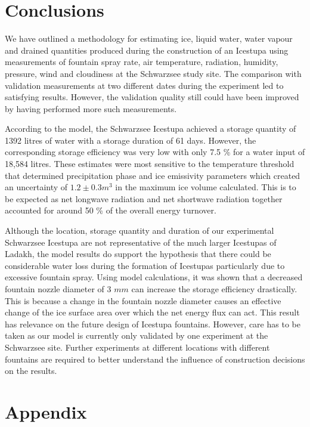 \documentclass[utf8]{frontiersSCNS} %
\begin{document}
\section{Conclusions} We have outlined a methodology for estimating ice,
liquid water, water vapour and drained quantities produced during the
construction of an Icestupa using measurements of fountain spray rate, air
temperature, radiation, humidity, pressure, wind and cloudiness at the
Schwarzsee study site. The comparison with validation measurements at two
different dates during the experiment led to satisfying results. However, the
validation quality still could have been improved by having performed more
such measurements.

According to the model, the Schwarzsee Icestupa achieved a storage quantity of
1392 litres of water with a storage duration of 61 days. However, the
corresponding storage efficiency was very low with only 7.5 \% for a water
input of 18,584 litres. These estimates were most sensitive to the temperature
threshold that determined precipitation phase and ice emissivity parameters
which created an uncertainty of $1.2 \pm 0.3 m^3$ in the maximum ice volume
calculated. This is to be expected as net longwave radiation and net shortwave
radiation together accounted for around 50 \% of the overall energy turnover.

Although the location, storage quantity and duration of our experimental
Schwarzsee Icestupa are not representative of the much larger Icestupas of
Ladakh, the model results do support the hypothesis that there could be
considerable water loss during the formation of Icestupas particularly due to
excessive fountain spray. Using model calculations, it was shown that a
decreased fountain nozzle diameter of 3 $mm$ can increase the storage
efficiency drastically. This is because a change in the fountain nozzle
diameter causes an effective change of the ice surface area over which the net
energy flux can act. This result has relevance on the future design of
Icestupa fountains. However, care has to be taken as our model is currently
only validated by one experiment at the Schwarzsee site. Further experiments
at different locations with different fountains are required to better
understand the influence of construction decisions on the results. 



\section{Appendix}
\end{document}
